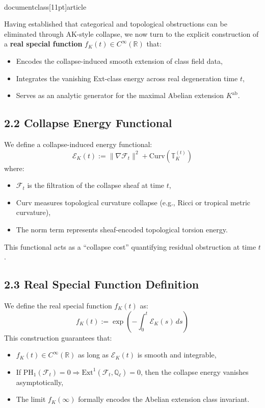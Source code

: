 \\documentclass[11pt]{article}
\begin{document}
Having established that categorical and topological obstructions can be eliminated through AK-style collapse, we now turn to the explicit construction of a \textbf{real special function} \( f_K(t) \in C^\infty(\mathbb{R}) \) that:
\begin{itemize}
    \item Encodes the collapse-induced smooth extension of class field data,
    \item Integrates the vanishing Ext-class energy across real degeneration time \( t \),
    \item Serves as an analytic generator for the maximal Abelian extension \( K^{\mathrm{ab}} \).
\end{itemize}

\subsection*{2.2 Collapse Energy Functional}

We define a collapse-induced energy functional:
\[
\mathcal{E}_K(t) := \|\nabla \mathcal{F}_t\|^2 + \mathrm{Curv}(\mathbb{T}_K^{(t)})
\]
where:
\begin{itemize}
    \item \( \mathcal{F}_t \) is the filtration of the collapse sheaf at time \( t \),
    \item \( \mathrm{Curv} \) measures topological curvature collapse (e.g., Ricci or tropical metric curvature),
    \item The norm term represents sheaf-encoded topological torsion energy.
\end{itemize}

This functional acts as a “collapse cost” quantifying residual obstruction at time \( t \).

\subsection*{2.3 Real Special Function Definition}

We define the real special function \( f_K(t) \) as:
\[
\boxed{
f_K(t) := \exp\left( - \int_0^t \mathcal{E}_K(s)\, ds \right)
}
\]
This construction guarantees that:
\begin{itemize}
    \item \( f_K(t) \in C^\infty(\mathbb{R}) \) as long as \( \mathcal{E}_K(t) \) is smooth and integrable,
    \item If \( \mathrm{PH}_1(\mathcal{F}_t) = 0 \Rightarrow \mathrm{Ext}^1(\mathcal{F}_t, \mathbb{Q}_\ell) = 0 \), then the collapse energy vanishes asymptotically,
    \item The limit \( f_K(\infty) \) formally encodes the Abelian extension class invariant.
\end{itemize}
\end{document}

